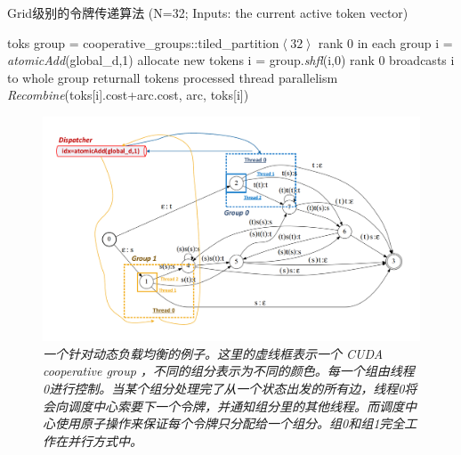 \vspace{-0.5em}
\begin{algorithm}[ht]
\caption{Grid级别的令牌传递算法 \textcolor[rgb]{0,0.5,0}{(N=32; Inputs: the current active token vector)}}
\label{code:load-balance}
\begin{algorithmic}[1]
 {toks}
\State group = cooperative\_groups::tiled\_partition$\left<32\right>$
\Comment\textcolor[rgb]{0,0.5,0}{rank 0 in each group}
\State i = \textit{atomicAdd}(global\_d,1)  \Comment\textcolor[rgb]{0,0.5,0}{allocate new tokens}
\EndIf      %
\State i = group.\textit{shfl}(i,0) \Comment \textcolor[rgb]{0,0.5,0}{rank 0 broadcasts i to whole group}
 return\Comment \textcolor[rgb]{0,0.5,0}{all tokens processed}
\EndIf 
{} \Comment \textcolor[rgb]{0,0.5,0}{thread parallelism}
 \textit{Recombine}(toks[i].cost+arc.cost, arc, toks[i])
\EndFor
\EndProcedure
\end{algorithmic}
\end{algorithm}


\begin{figure}[ht]
  \centering
    \includegraphics[width=1.1\linewidth]{figure/load-balance.pdf}
    \caption{\it 一个针对动态负载均衡的例子。这里的虚线框表示一个
      CUDA cooperative group ，不同的组分表示为不同的颜色。每一个组由线程0进行控制。当某个组分处理完了从一个状态出发的所有边，线程0将会向调度中心索要下一个令牌，并通知组分里的其他线程。而调度中心使用原子操作来保证每个令牌只分配给一个组分。组0和组1完全工作在并行方式中。}
    \label{fig:load-balance}
\end{figure}

